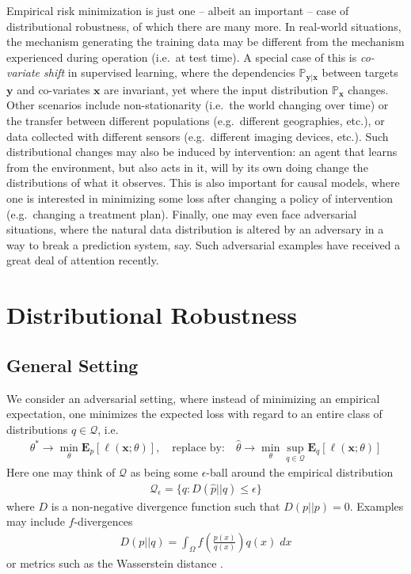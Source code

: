 \documentclass{article}
\newcommand{\x}{{\mathbf x}}
\newcommand{\y}{{\mathbf y}}
\newcommand{\E}{{\mathbf E}}
\renewcommand{\P}{{\mathbb P}}
\begin{document}
Empirical risk minimization is just one -- albeit an important -- case of distributional robustness, of which there are many more. In real-world situations, the mechanism generating the training data may be different from the mechanism experienced during operation (i.e.~at test time). A special case of this is \textit{co-variate shift} \cite{shimodaira2000improving} in supervised learning, where the dependencies $\P_{\y|\x}$ between targets $\y$ and co-variates $\x$  are invariant, yet where the input distribution $\P_\x$ changes. Other scenarios include non-stationarity (i.e.~the world changing over time) or the transfer between different populations (e.g.~different geographies, etc.), or data collected with different sensors (e.g.~different imaging devices, etc.). Such distributional changes may also be induced by intervention: an agent that learns from the environment, but also acts in it, will by its own doing change the distributions of what it observes. This is also important for causal models, where one is interested in minimizing some loss after changing a policy of intervention (e.g.~changing a treatment plan). Finally, one may even face adversarial situations, where the natural data distribution is altered by an adversary in a way to break a prediction system, say. Such adversarial examples \cite{szegedy2013intriguing, goodfellow2014explaining} have received a great deal of attention recently. 

\section{Distributional Robustness}

\subsection{General Setting}

We consider an adversarial setting, where instead of minimizing an empirical expectation, one minimizes the expected loss with regard to an entire class of distributions $q \in \mathcal Q$, i.e.
\begin{align}
\theta^* \rightarrow \min_\theta \E_p[\ell (\x; \theta)], \quad \text{replace by:} \quad
\hat\theta \rightarrow \min_\theta  \sup_{q \in \mathcal Q} \E_{q}\left[\ell(\x; \theta) \right]
\end{align}
Here one may  think of $\mathcal Q$ as being some $\epsilon$-ball around the empirical distribution
\begin{align}
\mathcal Q_\epsilon = \{ q: D(\hat p||q) \le \epsilon \}
\end{align}
where $D$ is a non-negative divergence function such that $D(p||p)=0$. Examples may include $f$-divergences \cite{namkoong2016stochastic,namkoong2017variance}
\begin{align}
D(p||q) = \int_\Omega f\left(\frac{p(x)}{q(x)}\right) q(x) \; dx
 \end{align}
or metrics such as the Wasserstein distance \cite{sinha2017certifiable}. 
\end{document}
